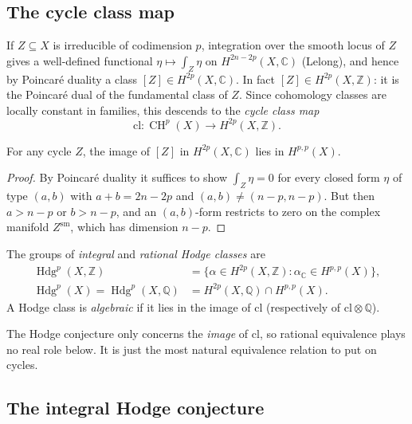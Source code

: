 \documentclass[12pt]{amsart}
\newcommand{\Q}{\mathbb{Q}}
\newcommand{\C}{\mathbb{C}}
\newcommand{\Z}{\mathbb{Z}}
\DeclareMathOperator{\Hdg}{Hdg}
\DeclareMathOperator{\CH}{CH}
\theoremstyle{definition}
\theoremstyle{remark}
\numberwithin{equation}{section}
\begin{document}
\subsection{The cycle class map}
If $Z \subseteq X$ is irreducible of codimension $p$, integration over the
smooth locus of $Z$ gives a well-defined functional
$\eta \mapsto \int_Z \eta$ on $H^{2n-2p}(X, \C)$ (Lelong), and hence by
Poincar\'e duality a class $[Z] \in H^{2p}(X, \C)$. In fact
$[Z] \in H^{2p}(X, \Z)$: it is the Poincar\'e dual of the fundamental class of
$Z$. Since cohomology classes are locally constant in families, this descends
to the \emph{cycle class map}
\begin{equation*}
    \mathrm{cl} \colon \CH^p(X) \to H^{2p}(X, \Z).
\end{equation*}

\begin{lemma}\label{lem:cycle-class-hodge}
    For any cycle $Z$, the image of $[Z]$ in $H^{2p}(X, \C)$ lies in
    $H^{p,p}(X)$.
\end{lemma}
\begin{proof}
    By Poincar\'e duality it suffices to show $\int_Z \eta = 0$ for every closed
    form $\eta$ of type $(a, b)$ with $a + b = 2n - 2p$ and
    $(a, b) \neq (n - p, n - p)$. But then $a > n - p$ or $b > n - p$, and an
    $(a,b)$-form restricts to zero on the complex manifold $Z^{\mathrm{sm}}$,
    which has dimension $n - p$.
\end{proof}

\begin{definition}
    The groups of \emph{integral} and \emph{rational Hodge classes} are
    \begin{align*}
        \Hdg^p(X, \Z) &= \{\alpha \in H^{2p}(X, \Z) : \alpha_\C \in H^{p,p}(X)\},\\
        \Hdg^p(X) = \Hdg^p(X, \Q) &= H^{2p}(X, \Q) \cap H^{p,p}(X).
    \end{align*}
    A Hodge class is \emph{algebraic} if it lies in the image of $\mathrm{cl}$
    (respectively of $\mathrm{cl} \otimes \Q$).
\end{definition}

\begin{remark}
    The Hodge conjecture only concerns the \emph{image} of $\mathrm{cl}$, so
    rational equivalence plays no real role below. It is just the most natural
    equivalence relation to put on cycles.
\end{remark}

\subsection{The integral Hodge conjecture}
\end{document}
